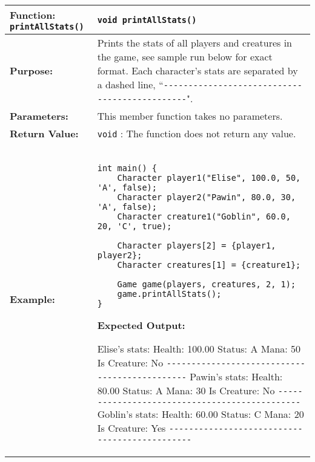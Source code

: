 \renewcommand{\arraystretch}{1.5}
\begin{longtable}{|p{1.7in}|p{4.3in}|}
\hline
\textbf{Function:} \texttt{printAllStats()} & \texttt{void printAllStats()} \\ \hline

\textbf{Purpose:} & Prints the stats of all players and creatures in the game, see sample run below for exact format. Each character's stats are separated by a dashed line, ``\verb|----------------------------------------------|". \\ \hline

\textbf{Parameters:} & 
This member function takes no parameters. \\ \hline

\textbf{Return Value:} & 
\texttt{void} : The function does not return any value. \\ \hline

\textbf{Example:} & 

\begin{example}

\begin{verbatim}

int main() {
    Character player1("Elise", 100.0, 50, 'A', false);
    Character player2("Pawin", 80.0, 30, 'A', false);
    Character creature1("Goblin", 60.0, 20, 'C', true);

    Character players[2] = {player1, player2};
    Character creatures[1] = {creature1};

    Game game(players, creatures, 2, 1);
    game.printAllStats();
}
\end{verbatim}
\end{example}

\textbf{Expected Output:} 

\vspace{5pt}
Elise's stats: \newline
Health: 100.00 \newline
Status: A \newline
Mana: 50 \newline
Is Creature: No \newline
\noindent \verb|----------------------------------------------| \newline
Pawin's stats: \newline
Health: 80.00 \newline
Status: A \newline
Mana: 30 \newline
Is Creature: No \newline
\noindent \verb|----------------------------------------------| \newline
Goblin's stats: \newline
Health: 60.00 \newline
Status: C \newline
Mana: 20 \newline
Is Creature: Yes \newline
\noindent \verb|----------------------------------------------| \newline


\end{longtable}
